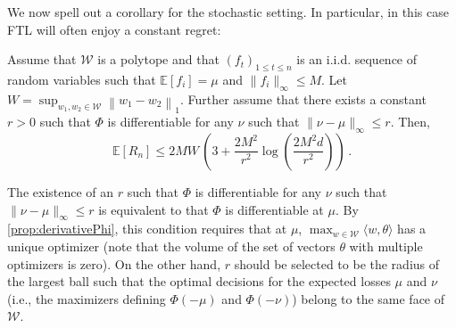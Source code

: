 \documentclass[english]{article}
\newcommand{\cW}{\mathcal{W}}
\newcommand{\Exp}[1]{\mathbb{E}\left[ #1 \right]}
\newcommand{\ip}[1]{\langle#1\rangle}
\newcommand{\norm}[1]{\left\| #1 \right\|}
\newcommand{\Prob}[1]{\mathbb{P}\left[#1\right]}
\begin{document}
We now spell out a corollary for the stochastic setting. In particular, in this case FTL will often enjoy a constant regret:
\begin{corollary}
	\label{cor:stocpolytope} Assume that $\cW$ is a polytope and 
	that $(f_t)_{1\le t \le n}$ is an i.i.d. sequence of random variables 
	such that $\Exp{f_i} = \mu$ and $\|f_i\|_\infty \le M$. Let  $W = \sup_{w_1,w_2\in \cW} \norm{w_1-w_2}_1$.
	Further assume that there exists a constant $r > 0$ 
	such that $\Phi$ is differentiable for any $\nu$ such that $\|\nu-\mu\|_\infty \le r$. 
	Then, %
	\[
		\Exp{R_n} \le 2MW \, \left( 3 + \frac{2M^2}{r^2}\log\left(\frac{2M^2d}{r^2}\right)\right)\,.%
	\]
\end{corollary}
 	The existence of an $r$ such that $\Phi$ is differentiable for any $\nu$ such that $\|\nu-\mu\|_\infty \le r$ is equivalent to that $\Phi$ is differentiable at $\mu$. 
	By \cref{prop:derivativePhi}, this condition requires that at $\mu$, $\max_{w\in\cW} \ip{w,\theta}$ has a unique optimizer (note that the volume of the set of vectors $\theta$ with multiple optimizers is zero). 
	On the other hand,  $r$ should be selected to be the radius of the largest ball such that the optimal decisions for the expected losses $\mu$ and $\nu$ (i.e., the maximizers defining $\Phi(-\mu)$ and $\Phi(-\nu)$) belong to the same face of $\cW$.
\end{document}
